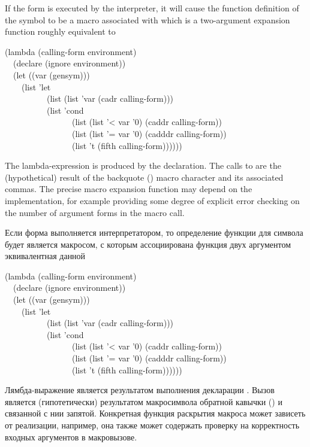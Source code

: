 \begin{defmac}
If the form is executed by the interpreter, it will cause the
function definition of the symbol 
to be a macro associated with which is
a two-argument expansion function roughly equivalent to
\begin{lisp}
(lambda (calling-form environment) \\
~~(declare (ignore environment)) \\
~~(let ((var (gensym))) \\
~~~~(list 'let \\
~~~~~~~~~~(list (list 'var (cadr calling-form))) \\
~~~~~~~~~~(list 'cond \\
~~~~~~~~~~~~~~~~(list (list '< var '0) (caddr calling-form)) \\
~~~~~~~~~~~~~~~~(list (list '= var '0) (cadddr calling-form)) \\
~~~~~~~~~~~~~~~~(list 't (fifth calling-form))))))
\end{lisp}
The lambda-expression is produced by the  declaration.
The calls to  are the (hypothetical) result of the backquote (\cd{{\Xbq}})
macro character and its associated commas.
The precise macro expansion function may depend on the implementation,
for example providing some degree of explicit error checking on the number
of argument forms in the macro call.

Если форма выполняется интерпретатором, то определение функции для символа
 будет является макросом, с которым ассоциирована функция двух
аргументом эквивалентная данной
\begin{lisp}
(lambda (calling-form environment) \\
~~(declare (ignore environment)) \\
~~(let ((var (gensym))) \\
~~~~(list 'let \\
~~~~~~~~~~(list (list 'var (cadr calling-form))) \\
~~~~~~~~~~(list 'cond \\
~~~~~~~~~~~~~~~~(list (list '< var '0) (caddr calling-form)) \\
~~~~~~~~~~~~~~~~(list (list '= var '0) (cadddr calling-form)) \\
~~~~~~~~~~~~~~~~(list 't (fifth calling-form))))))
\end{lisp}
Лямбда-выражение является результатом выполнения декларации .
Вызов  является (гипотетически) результатом макросимвола обратной
кавычки (\cd{{\Xbq}}) и связанной с нии запятой.
Конкретная функция раскрытия макроса может зависеть от реализации, например, она
также может содержать проверку на корректность входных аргументов в макровызове.


\end{defmac}
